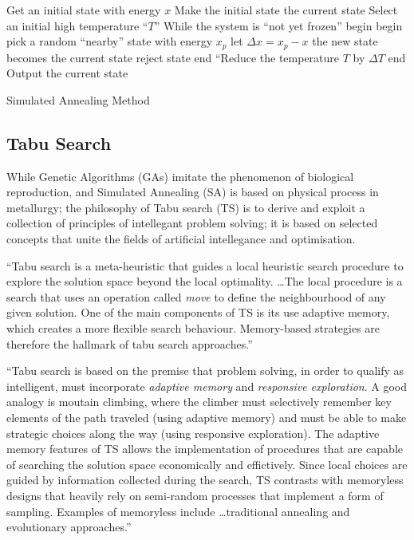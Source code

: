 \begin{algorithm}
\begin{algorithmic}[1]
\State Get an initial state with energy $x$
\State Make the initial state the current state
\State Select an initial high temperature ``$T$''
\State While the system is ``not yet frozen''
	\State begin
		\State begin
		\State pick a random ``nearby'' state with energy $x_p$
		\State let $\Delta x = x_p - x$
			\State the new state becomes the current state
		\Else
			\State reject state
		\EndIf
		\State end
	\EndWhile
	\State ``Reduce the temperature $T$ by $\Delta T$
	\State end
\State Output the current state
\end{algorithmic}
\caption{Simulated Annealing Method \cite{lam88}}
\label{SimAnn}
\end{algorithm}

\clearpage
\subsection{Tabu Search}

While Genetic Algorithms (GAs) imitate the phenomenon of biological reproduction, and Simulated Annealing (SA) is based on physical process in metallurgy; the philosophy of Tabu search (TS) is to derive and exploit a collection of principles of intellegant problem solving; it is based on selected concepts that unite the fields of artificial intellegance and optimisation. \cite{glover97}

``Tabu search is a meta-heuristic that guides a local heuristic search procedure to explore the solution space beyond the local optimality. \ldots The local procedure is a search that uses an operation called \emph{move} to define the neighbourhood of any given solution. One of the main components of TS is its use adaptive memory, which creates a more flexible search behaviour. Memory-based strategies are therefore the hallmark of tabu search approaches.'' \cite{glover97}

``Tabu search is based on the premise that problem solving, in order to qualify as intelligent, must incorporate \emph{adaptive memory} and \emph{responsive exploration}. A good analogy is moutain climbing, where the climber must selectively remember key elements of the path traveled (using adaptive memory) and must be able to make strategic choices along the way (using responsive exploration). The adaptive memory features of TS allows the implementation of procedures that are capable of searching the solution space economically and effictively. Since local choices are guided by information collected during the search, TS contrasts with memoryless designs that heavily rely on semi-random processes that implement a form of sampling. Examples of memoryless include \ldots traditional annealing and evolutionary approaches.'' \cite{glover97}

